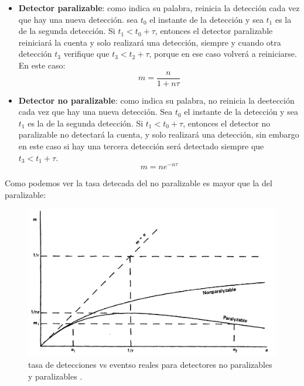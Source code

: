 \begin{itemize}
    \begin{itemize}
        \item \textbf{Detector paralizable}: como indica su palabra, reinicia la detección cada vez que hay una nueva detección. sea $t_0$ el instante de la detección y sea $t_1$ es la de la segunda detección. Si $t_1<t_0+\tau$, entonces el detector paralizable reiniciará la cuenta y solo realizará una detección, siempre y cuando otra detección $t_3$ verifique que $t_3<t_2+\tau$, porque en ese caso volverá a reiniciarse. En este caso:
        \begin{equation}
            m = \frac{n}{1+n\tau}
        \end{equation}
        \item \textbf{Detector no paralizable}: como indica su palabra, no reinicia la deetección cada vez que hay una nueva detección. Sea $t_0$ el instante de la detección y sea $t_1$ es la de la segunda detección. Si $t_1<t_0+\tau$, entonces el detector no paralizable no detectará la cuenta, y solo realizará una detección, sin embargo en este caso si hay una tercera detección será detectado siempre que $t_3<t_1+\tau$. 
        \begin{equation}
            m = n e^{-n \tau}
        \end{equation}
    \end{itemize}
    Como podemos ver la tasa detecada del no paralizable es mayor que la del paralizable: 
    \begin{figure}[H] \centering
        \caption{tasa de detecciones vs eventso reales para detectores no paralizables y paralizables \cite{Knoll:1300754}.}
        \includegraphics[width=0.7\linewidth]{Cuerpo/Ch_01/Detectores_muerto.png}
    \end{figure}
    
\end{itemize}

